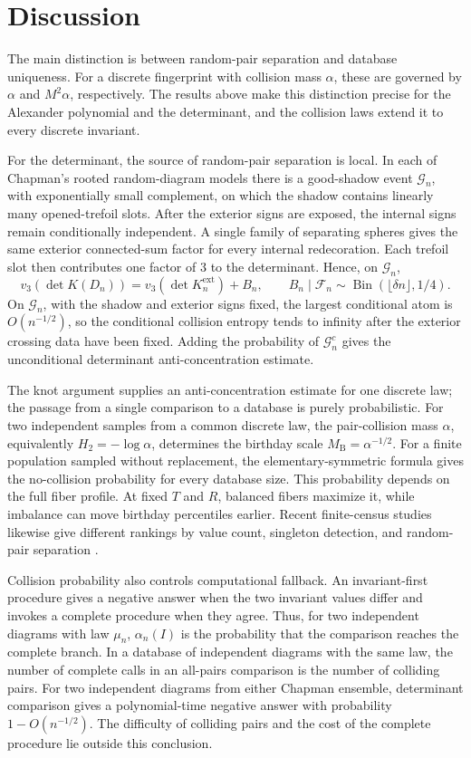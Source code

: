 \documentclass[9pt,twoside]{pnas-new}
\theoremstyle{definition}
\theoremstyle{remark}
\begin{document}
\section{Discussion}
The main distinction is between random-pair separation and database uniqueness.  For a discrete fingerprint with collision mass $\alpha$, these are governed by $\alpha$ and $M^2\alpha$, respectively.  The results above make this distinction precise for the Alexander polynomial and the determinant, and the collision laws extend it to every discrete invariant.

For the determinant, the source of random-pair separation is local.  In each of Chapman's rooted random-diagram models there is a good-shadow event $\mathcal G_n$, with exponentially small complement, on which the shadow contains linearly many opened-trefoil slots.  After the exterior signs are exposed, the internal signs remain conditionally independent.  A single family of separating spheres gives the same exterior connected-sum factor for every internal redecoration.  Each trefoil slot then contributes one factor of $3$ to the determinant.  Hence, on $\mathcal G_n$,
\[
 v_3(\det K(D_n))=v_3(\det K_n^{\mathrm{ext}})+B_n,
 \qquad
 B_n\mid\mathcal F_n\sim\operatorname{Bin}(\lfloor\delta n\rfloor,1/4).
\]
On $\mathcal G_n$, with the shadow and exterior signs fixed, the largest conditional atom is $O(n^{-1/2})$, so the conditional collision entropy tends to infinity after the exterior crossing data have been fixed.  Adding the probability of $\mathcal G_n^c$ gives the unconditional determinant anti-concentration estimate.

The knot argument supplies an anti-concentration estimate for one discrete law; the passage from a single comparison to a database is purely probabilistic.  For two independent samples from a common discrete law, the pair-collision mass $\alpha$, equivalently $H_2=-\log\alpha$, determines the birthday scale $M_{\mathrm B}=\alpha^{-1/2}$.  For a finite population sampled without replacement, the elementary-symmetric formula gives the no-collision probability for every database size.  This probability depends on the full fiber profile.  At fixed $T$ and $R$, balanced fibers maximize it, while imbalance can move birthday percentiles earlier.  Recent finite-census studies likewise give different rankings by value count, singleton detection, and random-pair separation \cite{dlotkogurnarisazdanovic2025,tubbenhauerzhang2025,kelomakietal2025}.

Collision probability also controls computational fallback.  An invariant-first procedure gives a negative answer when the two invariant values differ and invokes a complete procedure when they agree.  Thus, for two independent diagrams with law $\mu_n$, $\alpha_n(I)$ is the probability that the comparison reaches the complete branch.  In a database of independent diagrams with the same law, the number of complete calls in an all-pairs comparison is the number of colliding pairs.  For two independent diagrams from either Chapman ensemble, determinant comparison gives a polynomial-time negative answer with probability $1-O(n^{-1/2})$.  The difficulty of colliding pairs and the cost of the complete procedure lie outside this conclusion.
\end{document}
